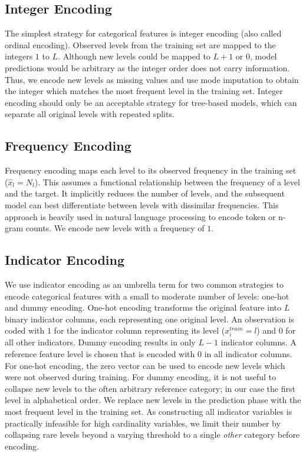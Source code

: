 \documentclass[smallextended]{svjour3}       %
\begin{document}
\hypertarget{integer-encoding}{%
\subsection{Integer Encoding}\label{integer-encoding}}

The simplest strategy for categorical features is integer encoding (also called ordinal encoding).
Observed levels from the training set are mapped to the integers \(1\) to \(L\).
Although new levels could be mapped to \(L+1\) or \(0\), model predictions would be arbitrary as the integer order does not carry information.
Thus, we encode new levels as missing values and use mode imputation to obtain the integer which matches the most frequent level in the training set.
Integer encoding should only be an acceptable strategy for tree-based models, which can separate all original levels with repeated splits.

\hypertarget{frequency-encoding}{%
\subsection{Frequency Encoding}\label{frequency-encoding}}

Frequency encoding maps each level to its observed frequency in the training set (\(\hat{x}_l = N_l\)).
This assumes a functional relationship between the frequency of a level and the target.
It implicitly reduces the number of levels, and the subsequent model can best differentiate between levels with dissimilar frequencies.
This approach is heavily used in natural language processing to encode token or n-gram counts.
We encode new levels with a frequency of \(1\).

\hypertarget{indicator-encoding}{%
\subsection{Indicator Encoding}\label{indicator-encoding}}

We use indicator encoding as an umbrella term for two common strategies to encode categorical features with a small to moderate number of levels: one-hot and dummy encoding.
One-hot encoding transforms the original feature into \(L\) binary indicator columns, each representing one original level.
An observation is coded with \(1\) for the indicator column representing its level (\(x^{train}_i = l\)) and \(0\) for all other indicators.
Dummy encoding results in only \(L-1\) indicator columns.
A reference feature level is chosen that is encoded with \(0\) in all indicator columns.
For one-hot encoding, the zero vector can be used to encode new levels which were not observed during training.
For dummy encoding, it is not useful to collapse new levels to the often arbitrary reference category; in our case the first level in alphabetical order.
We replace new levels in the prediction phase with the most frequent level in the training set.
As constructing all indicator variables is practically infeasible for high cardinality variables, we limit their number by collapsing rare levels beyond a varying threshold to a single \emph{other} category before encoding.
\end{document}
